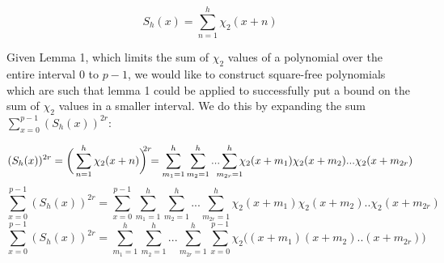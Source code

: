 \documentclass{report}
\begin{document}
$$S_h(x)=\sum\limits_{n=1}^{h}\chi_2(x+n)$$

Given Lemma 1, which limits the sum of $\chi_2$ values of a polynomial over the entire interval $0$ to $p-1$, we would like to construct square-free polynomials which are such that lemma 1 could be applied to successfully put a bound on the sum of $\chi_2$ values in a smaller interval. We do this by expanding the sum $\sum\limits_{x=0}^{p-1}(S_h(x))^{2r}$:

$$(S_h(x))^{2r}= \bigg(\sum\limits_{n=1}^{h}\chi_2(x+n)\bigg)^{\mathclap{2r}} =\sum\limits_{m_1=1}^h\sum\limits_{m_2=1}^h...\sum\limits_{\mathclap{m_{2r}=1}}^h\chi_2(x+m_1)\chi_2(x+m_2)...\chi_2(x+m_{2r})$$
$$\sum\limits_{x=0}^{p-1}(S_h(x))^{2r}=\sum\limits_{x=0}^{p-1}\sum\limits_{m_1=1}^h\sum\limits_{m_2=1}^h...\sum\limits_{m_{2r}=1}^h\chi_2(x+m_1)\chi_2(x+m_2)..\chi_2(x+m_{2r})$$
\begin{equation} \label{sumpoly}
\sum\limits_{x=0}^{p-1} (S_h(x))^{2r} =\sum\limits_{m_1=1}^h \sum\limits_{m_2=1}^h... \sum\limits_{m_{2r}=1}^h\sum\limits_{x=0}^{p-1}\chi_2\big((x+m_1)(x+m_2)..(x+m_{2r})\big)
\end{equation}
\end{document}
